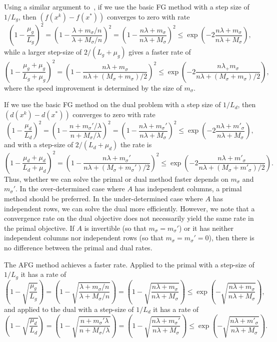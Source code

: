 \documentclass{article}
\begin{document}
Using a similar argument to~\cite[Theorem 2.1.15]{nesterov2004introductory}, if we use the basic FG method with a step size of $1/L_g$, then $(f(x^k) - f(x^\ast))$ converges to zero with rate
\[
\left(1-\frac{\mu_g}{L_g}\right)^2 
= \left(1 - \frac{\lambda + m_\sigma/n}{\lambda + M_\sigma/n}\right)^2 
= \left(1 - \frac{n\lambda + m_\sigma}{n\lambda + M_\sigma}\right)^2 
\leq \exp\left(-2\frac{n\lambda + m_\sigma}{n\lambda + M_\sigma}\right),
\]
while a larger step-size of $2/(L_g+\mu_g)$ gives a faster rate of
\[
\left(1 - \frac{\mu_g + \mu_g}{L_g + \mu_g}\right)^2
= \left(1 - \frac{n\lambda + m_\sigma}{n\lambda + (M_\sigma + m_\sigma)/2}\right)^2
\leq \exp\left(-2\frac{n\lambda _+ m_\sigma}{n\lambda + (M_\sigma + m_\sigma)/2}\right),
\]
where the speed improvement is determined by the size of $m_\sigma$.

If we use the basic FG method on the dual problem with a step size of $1/L_d$, then $(d(x^k) - d(x^\ast))$ converges to zero with rate
\[
\left(1-\frac{\mu_d}{L_d}\right)^2
= \left(1-\frac{n + m_\sigma'/\lambda}{n + M_\sigma/\lambda}\right)^2 
= \left(1-\frac{n\lambda + m_\sigma'}{n\lambda + M_\sigma}\right)^2
\leq \exp\left(-2\frac{n\lambda + m'_\sigma}{n\lambda + M_\sigma}\right),
\]
and with a step-size of $2/(L_d+\mu_d)$ the rate is
\[
\left(1 - \frac{\mu_d + \mu_d}{L_d + \mu_d}\right)^2
= \left(1 - \frac{ n\lambda + m_\sigma'}{n\lambda + (M_\sigma + m_\sigma')/2}\right)^2
\leq \exp\left(-2\frac{n\lambda + m'_\sigma}{n\lambda + (M_\sigma + m'_\sigma)/2}\right).
\]
Thus, whether we can solve the primal or dual method faster depends on $m_\sigma$ and $m_\sigma'$. In the over-determined case where $A$ has independent columns, a primal method should be preferred. In the under-determined case where $A$ has independent rows, we can solve the dual more efficiently. However, we note that a convergence rate on the dual objective does not necessarily yield the same rate in the primal objective. If $A$ is invertible (so that $m_\sigma=m_\sigma'$) or it has neither independent columns nor independent rows (so that $m_\sigma = m_\sigma' = 0$), then there is no difference between the primal and dual rates.

The AFG method achieves a faster rate. Applied to the primal with a step-size of $1/L_g$ it has a rate of~\cite[Theorem 2.2.2]{nesterov2004introductory}
\[
\left(1-\sqrt{\frac{\mu_g}{L_g}}\right)
= \left(1-\sqrt{\frac{\lambda + m_\sigma/n}{\lambda + M_\sigma/n}}\right)
= \left(1-\sqrt{\frac{n\lambda + m_\sigma}{n\lambda + M_\sigma}}\right)
\leq \exp\left(-\sqrt{\frac{n\lambda + m_\sigma}{n\lambda + M_\sigma}}\right),
\]
and applied to the dual with a step-size of $1/L_d$ it has a rate of
\[
\left(1-\sqrt{\frac{\mu_d}{L_d}}\right)
= \left(1-\sqrt{\frac{n + m_\sigma'\lambda}{n + M_\sigma/\lambda}}\right)
= \left(1-\sqrt{\frac{n\lambda + m_\sigma'}{n\lambda + M_\sigma}}\right)
\leq \exp\left(-\sqrt{\frac{n\lambda + m'_\sigma}{n\lambda + M_\sigma}}\right).
\]
\end{document}
